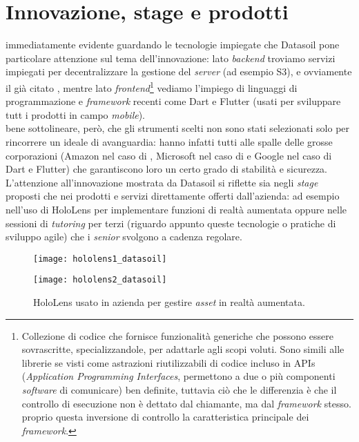 \section{Innovazione, stage e prodotti}
\e{} immediatamente evidente guardando le tecnologie impiegate che Datasoil pone particolare attenzione sul tema dell'innovazione: lato \textit{backend} troviamo servizi \aws{} impiegati per decentralizzare la gestione del \textit{server} (ad esempio S3), e ovviamente il già citato \asa{}, mentre lato \textit{frontend}\footnote{Collezione di codice che fornisce funzionalità generiche che possono essere sovrascritte, specializzandole, per adattarle agli scopi voluti. Sono simili alle librerie se visti come astrazioni riutilizzabili di codice incluso in APIs (\textit{Application Programming Interfaces}, permettono a due o più componenti \textit{software} di comunicare) ben definite, tuttavia ciò che le differenzia è che il controllo di esecuzione non è dettato dal chiamante, ma dal \textit{framework} stesso. \e{} proprio questa inversione di controllo la caratteristica principale dei \textit{framework}.} vediamo l'impiego di linguaggi di programmazione e \textit{framework} recenti come Dart e Flutter (usati per sviluppare tutt i prodotti in campo \textit{mobile}).\\
\e{} bene sottolineare, però, che gli strumenti scelti non sono stati selezionati solo per rincorrere un ideale di avanguardia: hanno infatti tutti alle spalle delle grosse corporazioni (Amazon nel caso di \aws{}, Microsoft nel caso di \asa{} e Google nel caso di Dart e Flutter) che garantiscono loro un certo grado di stabilità e sicurezza.\\
L'attenzione all'innovazione mostrata da Datasoil si riflette sia negli \textit{stage} proposti che nei prodotti e servizi direttamente offerti dall'azienda: ad esempio nell'uso di HoloLens per implementare funzioni di realtà aumentata oppure nelle sessioni di \textit{tutoring} per terzi (riguardo appunto queste tecnologie o pratiche di sviluppo agile) che i \textit{senior} svolgono a cadenza regolare.
\begin{figure}[H]
    \centering
    \begin{minipage}{.5\textwidth}
      \centering
      \texttt{[image: hololens1\_datasoil]}
      \label{fig:test1}
    \end{minipage}%
    \begin{minipage}{.5\textwidth}
      \centering
      \texttt{[image: hololens2\_datasoil]}
    \end{minipage}
    \caption[HoloLens usato in azienda]{HoloLens usato in azienda per gestire \textit{asset} in realtà aumentata.\footnotemark}
\end{figure}

